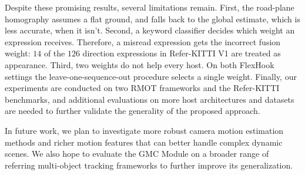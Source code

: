\documentclass{article}
\begin{document}
Despite these promising results, several limitations remain. First, the road-plane homography assumes a flat ground, and falls back to the global estimate, which is less accurate, when it isn't. Second, a keyword classifier decides which weight an expression receives. Therefore, a misread expression gets the incorrect fusion weight: $14$ of the $126$ direction expressions in Refer-KITTI V1 are treated as appearance. Third, two weights do not help every host. On both FlexHook settings the leave-one-sequence-out procedure selects a single weight. Finally, our experiments are conducted on two RMOT frameworks and the Refer-KITTI benchmarks, and additional evaluations on more host architectures and datasets are needed to further validate the generality of the proposed approach.

In future work, we plan to investigate more robust camera motion estimation methods and richer motion features that can better handle complex dynamic scenes. We also hope to evaluate the GMC Module on a broader range of referring multi-object tracking frameworks to further improve its generalization.



\end{document}
